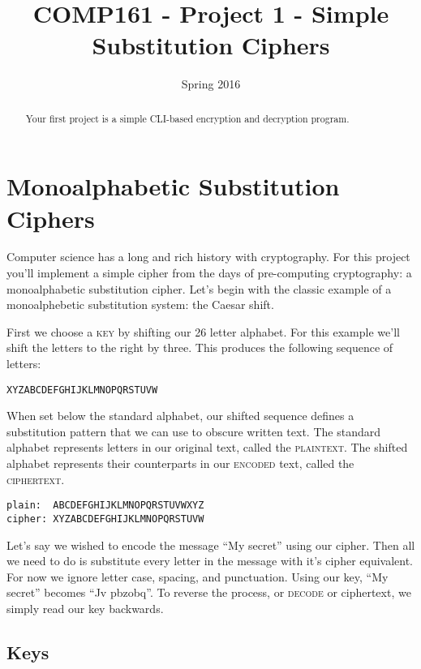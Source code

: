 \documentclass[]{tufte-handout}
\title{COMP161 - Project 1 - Simple Substitution Ciphers}
\author{}
\date{Spring 2016}
\begin{document}
\maketitle

\begin{abstract}
Your first project is a simple CLI-based encryption and decryption program.
\end{abstract}

\section{Monoalphabetic Substitution Ciphers}

Computer science has a long and rich history with cryptography.  For this project you'll implement a simple cipher from the days of pre-computing cryptography: a monoalphabetic substitution cipher.  Let's begin with the classic example of a monoalphebetic substitution system: the Caesar shift. 

First we choose a \textsc{key} by shifting our 26 letter alphabet.  For this example we'll shift the letters to the right by three. This produces the following sequence of letters:
\begin{verbatim}
XYZABCDEFGHIJKLMNOPQRSTUVW
\end{verbatim}
When set below the standard alphabet, our shifted sequence defines a substitution pattern that we can use to obscure written text.  The standard alphabet represents letters in our original text, called the \textsc{plaintext}. The shifted alphabet represents their counterparts in our \textsc{encoded} text, called the \textsc{ciphertext}. 
\begin{verbatim}
plain:  ABCDEFGHIJKLMNOPQRSTUVWXYZ
cipher: XYZABCDEFGHIJKLMNOPQRSTUVW
\end{verbatim}

Let's say we wished to encode the message ``My secret'' using our cipher.  Then all we need to do is substitute every letter in the message with it's cipher equivalent. For now we ignore letter case, spacing, and punctuation.  Using our key, ``My secret'' becomes ``Jv pbzobq''. To reverse the process, or \textsc{decode} or ciphertext, we simply read our key backwards. 

\subsection*{Keys}
\end{document}

